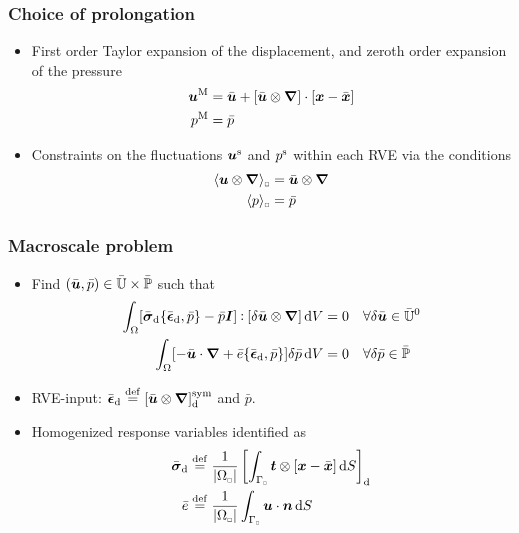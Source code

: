 \documentclass[11pt]{beamer} %
\DeclarePairedDelimiter{\homgen}{\langle}{\rangle_\rve}
\renewcommand{\dev}{\mathrm{d}}
\newcommand{\volume}{|\Omega_\rve|}
\newcommand{\rve}{
  {\mathchoice
   {\mbox{\scalebox{0.67}{$\Box$}}}
   {\mbox{\scalebox{0.67}{$\Box$}}}
   {\mbox{\scalebox{0.5}{$\Box$}}}
   {\mbox{\scalebox{0.375}{$\Box$}}}
  }
}
\begin{document}
\begin{frame}
 \frametitle{Choice of prolongation}
\begin{itemize}
 \item First order Taylor expansion of the displacement, and zeroth order expansion of the pressure
\begin{align*}
 \boldsymbol{u}^{\mathrm{M}} &= \bar{\boldsymbol{u}} + [\bar{\boldsymbol{u}}\mathbin{\otimes}\boldsymbol{\nabla}]\cdot[\boldsymbol{x} - \bar{\boldsymbol{x}}]
\\
 p^{\mathrm{M}} &= \bar{p}
\end{align*}
 \item Constraints on the fluctuations $\boldsymbol{u}^{\mathrm{s}}$ and $p^{\mathrm{s}}$ within each RVE via the conditions
\begin{align*}
 \homgen{\ta u\outerp\diff} &= \bar{\ta u}\outerp\diff
\\
 \homgen{p} &= \bar{p}
\end{align*}
\end{itemize}
\end{frame}

\begin{frame}
 \frametitle{Macroscale problem}
\begin{itemize}
 \item Find $(\bar{\boldsymbol{u}}, \bar{p}) \in \bar{\mathbb{U}}\times \bar{\mathbb{P}}$ such that
 \begin{align*}
  \int_\Omega [{\bar{\ts\sigma}_\dev\{\bar{\ts\epsilon}_\dev, \bar{p}\}} - \bar{p}\ts I]\dprod[\delta\bar{\ta u}\outerp\diff]\dif V &= 0\quad \forall \delta\bar{\ta u} \in \bar{\set{U}}^0
\\
  \int_\Omega [-\bar{\ta u}\cdot\diff + {\bar{e}\{\bar{\ts\epsilon}_\dev, \bar{p}\}}]\delta\bar{p}\dif V &= 0\quad \forall \delta\bar{p} \in \bar{\set{P}}
 \end{align*}
 \item RVE-input: $\bar{\ts\epsilon}_\dev\defeq [\bar{\ta u}\outerp\diff]^\sym_\dev$ and $\bar{p}$.
 \item Homogenized response variables identified as
 \begin{align*}
 \bar{\ts\sigma}_\dev &\defeq \frac{1}{\volume} \left[\int_{\Gamma_\rve} \ta t \outerp [\ta x-\bar{\ta x}]\dif S\right]_\dev
\\
 \bar{e} &\defeq \frac{1}{\volume} \int_{\Gamma_\rve} \ta u \cdot \ta n\dif S
 \end{align*}
\end{itemize}
\end{frame}
\end{document}
